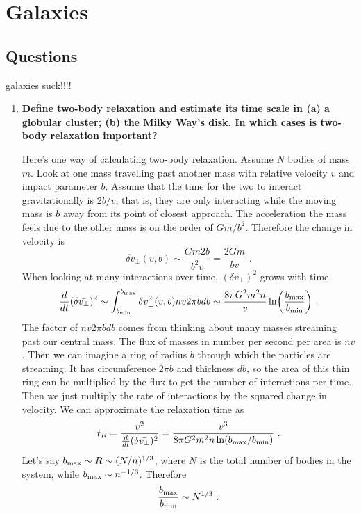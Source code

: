 \section{Galaxies}
\subsection{Questions}
galaxies suck!!!!
\begin{enumerate}
\item \textbf{Define two-body relaxation and estimate its time scale in (a) a globular cluster; (b)
      the Milky Way's disk. In which cases is two-body relaxation important?}
      
      Here's one way of calculating two-body relaxation. Assume $N$ bodies of mass $m$. Look at one mass travelling past another mass with relative velocity $v$ and impact parameter $b$. Assume that the time for the two to interact gravitationally is $2b/v$, that is, they are only interacting while the moving mass is $b$ away from its point of closest approach. The acceleration the mass feels due to the other mass is on the order of $Gm/b^2$. Therefore the change in velocity is
      \begin{equation}
      \delta v_\perp (v,b) \sim \frac{Gm2b}{b^2v} = \frac{2Gm}{bv}\,\,.
      \end{equation}
      When looking at many interactions over time, $(\delta v_\perp)^2$ grows with time.
      \begin{equation}
      \frac{d}{dt}(\delta \bar{v_\perp})^2 \sim \int^{b_{\rm max}}_{b_{\rm min}}\delta v_\perp^2(v,b) n v 2 \pi b db \sim \frac{8 \pi G^2 m^2 n}{v} \ln \biggl( \frac{b_{\rm max}}{b_{\rm min}} \biggr) \,\, .
      \end{equation}
      The factor of $n v 2 \pi b db$ comes from thinking about many masses streaming past our central mass. The flux of masses in number per second per area is $nv$. Then we can imagine a ring of radius $b$ through which the particles are streaming. It has circumference $2 \pi b$ and thickness $db$, so the area of this thin ring can be multiplied by the flux to get the number of interactions per time. Then we just multiply the rate of interactions by the squared change in velocity. We can approximate the relaxation time as
      \begin{equation}
      t_R = \frac{v^2}{\frac{d}{dt}(\delta \bar{v_\perp})^2} = \frac{v^3}{8 \pi G^2 m^2 n \ln(b_{\rm max}/b_{\rm min})} \,\,.
      \end{equation}
      Let's say $b_{\rm max} \sim R \sim (N/n)^{1/3}$, where $N$ is the total number of bodies in the system, while $b_{\rm max} \sim n^{-1/3}$. Therefore
      \begin{equation}
      \frac{b_{\rm max}}{b_{\rm min}} \sim N^{1/3}\,\,.
      \end{equation}
      

\end{enumerate}
